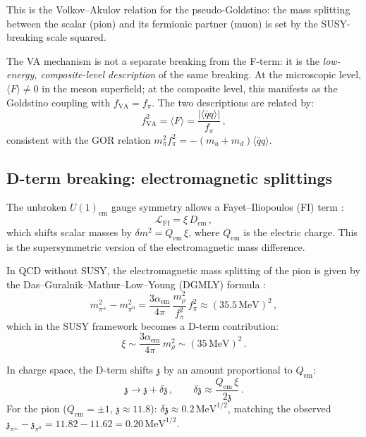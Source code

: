 \documentclass[12pt,a4paper]{article}
\newcommand{\MeV}{\,\text{MeV}}
\newcommand{\qqbar}{\langle\bar{q}q\rangle}
\newcommand{\zch}{\mathfrak{z}}
\begin{document}
This is the Volkov--Akulov relation for the pseudo-Goldstino: the 
mass splitting between the scalar (pion) and its fermionic partner 
(muon) is set by the SUSY-breaking scale squared.

The VA mechanism is not a separate breaking from the F-term: it is 
the \emph{low-energy, composite-level description} of the same 
breaking. At the microscopic level, $\langle F\rangle \neq 0$ 
in the meson superfield; at the composite level, this manifests 
as the Goldstino coupling with $f_{\text{VA}} = f_\pi$. The two 
descriptions are related by:
\begin{equation}
f_{\text{VA}}^2 = \langle F\rangle = \frac{|\qqbar|}{f_\pi}\,,
\end{equation}
consistent with the GOR relation $m_\pi^2 f_\pi^2 = 
-(m_u + m_d)\qqbar$.

\subsection{D-term breaking: electromagnetic splittings}
\label{subsec:dterm}

The unbroken $U(1)_{\text{em}}$ gauge symmetry allows a 
Fayet--Iliopoulos (FI) term \cite{FayetIliopoulos}:
\begin{equation}
\mathcal{L}_{\text{FI}} = \xi\,D_{\text{em}}\,,
\end{equation}
which shifts scalar masses by $\delta m^2 = Q_{\text{em}}\,\xi$, 
where $Q_{\text{em}}$ is the electric charge. This is the 
supersymmetric version of the electromagnetic mass difference.

In QCD without SUSY, the electromagnetic mass splitting of the 
pion is given by the Das--Guralnik--Mathur--Low--Young (DGMLY) 
formula \cite{DGMLY1967}:
\begin{equation}
m_{\pi^\pm}^2 - m_{\pi^0}^2 = \frac{3\alpha_{\text{em}}}{4\pi}\,
\frac{m_\rho^2}{f_\pi^2}\,f_\pi^2 
\approx (35.5\MeV)^2\,,
\end{equation}
which in the SUSY framework becomes a D-term contribution:
\begin{equation}
\xi \sim \frac{3\alpha_{\text{em}}}{4\pi}\,m_\rho^2 
\sim (35\MeV)^2\,.
\end{equation}

In charge space, the D-term shifts $\zch$ by an amount proportional 
to $Q_{\text{em}}$:
\begin{equation}
\zch \to \zch + \delta\zch\,, \qquad 
\delta\zch \approx \frac{Q_{\text{em}}\,\xi}{2\zch}\,.
\end{equation}
For the pion ($Q_{\text{em}} = \pm 1$, $\zch \approx 11.8$): 
$\delta\zch \approx 0.2\MeV^{1/2}$, matching the observed 
$\zch_{\pi^\pm} - \zch_{\pi^0} = 11.82 - 11.62 = 0.20\MeV^{1/2}$.
\end{document}
